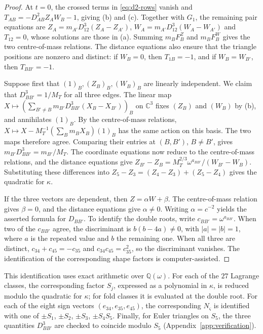 \documentclass[11pt]{amsart}
\theoremstyle{definition}
\theoremstyle{remark}
\newcommand{\C}{\mathbb{C}}
\begin{document}
\begin{proof}
{At $t=0$, the crossed terms in \eqref{eq:d2-rows} vanish and
$T_{AB}=-D_{AB}^2Z_AW_B-1$, giving (b) and (c).  Together with $G_1$, the remaining pair
equations are $Z_A=m_{A'}D_{12}^3(Z_A-Z_{A'})$,
$W_A=m_{A'}D_{12}^3(W_A-W_{A'})$ and $T_{12}=0$, whose solutions are those in (a).
Summing $m_BF^Z_B$ and $m_BF^W_B$ gives the two centre-of-mass relations.
The distance equations also ensure that the triangle positions are nonzero and distinct:
if $W_B=0$, then $T_{1B}=-1$, and if $W_B=W_{B'}$, then $T_{BB'}=-1$.}

{Suppose first that $(1)_B,(Z_B)_B,(W_B)_B$ are linearly independent.
We claim that $D_{BB'}^3=1/M_T$ for all three edges.  The linear map
$X\mapsto(\sum_{B'\ne B}m_{B'}D_{BB'}^3(X_B-X_{B'}))_B$ on $\C^3$ fixes $(Z_B)$ and $(W_B)$
by (b), and annihilates $(1)_B$.  By the centre-of-mass relations,
$X\mapsto X-M_T^{-1}(\sum_Bm_BX_B)(1)_B$ has the same action on this basis.
The two maps therefore agree.  Comparing their entries at $(B,B')$, $B\ne B'$, gives
$m_{B'}D_{BB'}^3=m_{B'}/M_T$.
The coordinate equations now reduce to the centre-of-mass relations, and the distance
equations give $Z_{B'}-Z_B=M_T^{2/3}\omega^{a_{BB'}}/(W_{B'}-W_B)$.
Substituting these differences into $Z_5-Z_3=(Z_4-Z_3)+(Z_5-Z_4)$ gives the quadratic for
$\kappa$.}

{If the three vectors are dependent, then $Z=\alpha W+\beta$.
The centre-of-mass relation gives $\beta=0$, and the distance equations give $\alpha\ne0$.
Writing $\alpha=c^{-2}$ yields the asserted formula for $D_{BB'}$.
To identify the double roots, write $c_{BB'}=\omega^{a_{BB'}}$.
When two of the $c_{BB'}$ agree, the discriminant is $b(b-4a)\ne0$, with $|a|=|b|=1$,
where $a$ is the repeated value and $b$ the remaining one.
When all three are distinct, $c_{34}+c_{45}=-c_{35}$ and $c_{34}c_{45}=c_{35}^2$, so the
discriminant vanishes.  The identification of the corresponding shape factors is
computer-assisted.}
\end{proof}

{This identification uses exact arithmetic over $\mathbb Q(\omega)$.
For each of the $27$ Lagrange classes, the corresponding factor $S_j$, expressed as a
polynomial in $\kappa$, is reduced modulo the quadratic for $\kappa$; for fold classes it is
evaluated at the double root.  For each of the eight sign vectors $(e_{34},e_{35},e_{45})$,
the corresponding $N_\varsigma$ is identified with one of $\pm S_1$, $\pm S_2$, $\pm S_3$,
$\pm S_4S_5$.  Finally, for Euler triangles on $S_5$, the three quantities $D_{BB'}^3$ are
checked to coincide modulo $S_5$ (Appendix~\ref{app:verification}).}
\end{document}
